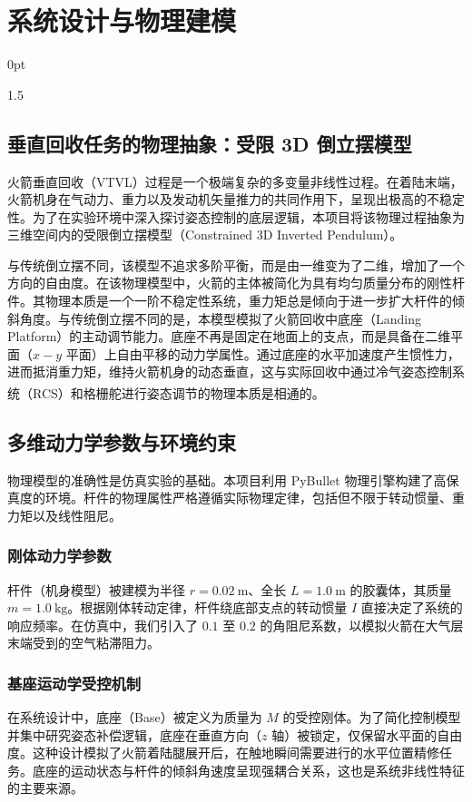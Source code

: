 \documentclass[zihao=-4]{ctexart}
\newcommand{\upcite}[1]{\textsuperscript{\cite{#1}}}
\newcommand{\setParDis}{\setlength {\parskip} {0pt} }
\begin{document}
\section{系统设计与物理建模}
\setParDis
\begin{spacing}{1.5}

\subsection{垂直回收任务的物理抽象：受限 3D 倒立摆模型}
火箭垂直回收（VTVL）过程是一个极端复杂的多变量非线性过程。在着陆末端，火箭机身在气动力、重力以及发动机矢量推力的共同作用下，呈现出极高的不稳定性。为了在实验环境中深入探讨姿态控制的底层逻辑，本项目将该物理过程抽象为三维空间内的受限倒立摆模型（Constrained 3D Inverted Pendulum）。



与传统倒立摆不同，该模型不追求多阶平衡，而是由一维变为了二维，增加了一个方向的自由度。在该物理模型中，火箭的主体被简化为具有均匀质量分布的刚性杆件。其物理本质是一个一阶不稳定性系统，重力矩总是倾向于进一步扩大杆件的倾斜角度。与传统倒立摆不同的是，本模型模拟了火箭回收中底座（Landing Platform）的主动调节能力。底座不再是固定在地面上的支点，而是具备在二维平面（$x-y$ 平面）上自由平移的动力学属性。通过底座的水平加速度产生惯性力，进而抵消重力矩，维持火箭机身的动态垂直，这与实际回收中通过冷气姿态控制系统（RCS）\upcite{Steuer2011RCS}和格栅舵进行姿态调节的物理本质是相通的。

\subsection{多维动力学参数与环境约束}
物理模型的准确性是仿真实验的基础。本项目利用 PyBullet 物理引擎构建了高保真度的环境。杆件的物理属性严格遵循实际物理定律，包括但不限于转动惯量、重力矩以及线性阻尼。

\subsubsection{刚体动力学参数}
杆件（机身模型）被建模为半径 $r=0.02\ \mathrm{m}$、全长 $L=1.0\ \mathrm{m}$ 的胶囊体，其质量 $m=1.0\ \mathrm{kg}$。根据刚体转动定律，杆件绕底部支点的转动惯量 $I$ 直接决定了系统的响应频率。在仿真中，我们引入了 $0.1$ 至 $0.2$ 的角阻尼系数，以模拟火箭在大气层末端受到的空气粘滞阻力。

\subsubsection{基座运动学受控机制}
在系统设计中，底座（Base）被定义为质量为 $M$ 的受控刚体。为了简化控制模型并集中研究姿态补偿逻辑，底座在垂直方向（$z$ 轴）被锁定，仅保留水平面的自由度。这种设计模拟了火箭着陆腿展开后，在触地瞬间需要进行的水平位置精修任务。底座的运动状态与杆件的倾斜角速度呈现强耦合关系，这也是系统非线性特征的主要来源。


\end{spacing}
\end{document}
